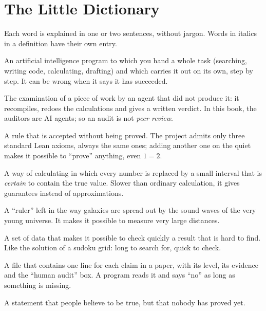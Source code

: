 \chapter{The Little Dictionary}

Each word is explained in one or two sentences, without jargon. Words in italics in a definition have their own entry.

\begin{description}[style=nextline,leftmargin=0pt,font=\normalfont\sffamily\bfseries\color{okbleu},itemsep=5pt]
\item[AI agent] An artificial intelligence program to which you hand a whole task (searching, writing code,
calculating, drafting) and which carries it out on its own, step by step. It can be wrong when it says it has
succeeded.
\item[Audit] The examination of a piece of work by an agent that did not produce it: it recompiles, redoes the
calculations and gives a written verdict. In this book, the auditors are AI agents; so an audit is not \emph{peer
review}.
\item[Axiom] A rule that is accepted without being proved. The project admits only three standard Lean axioms, always the same ones; adding
another one on the quiet makes it possible to ``prove'' anything, even $1=2$.
\item[Ball (or interval) arithmetic] A way of calculating in which every number is replaced by a small interval that is
\emph{certain} to contain the true value. Slower than ordinary calculation, it gives guarantees instead of
approximations.
\item[BAO (baryon acoustic oscillations)] A ``ruler'' left in the way galaxies are spread out by the sound waves of the
very young universe. It makes it possible to measure very large distances.
\item[Certificate] A set of data that makes it possible to check quickly a result that is hard to find. Like the
solution of a sudoku grid: long to search for, quick to check.
\item[Claims ledger] A file that contains one line for each claim in a paper, with its level, its evidence and the
``human audit'' box. A program reads it and says ``no'' as long as something is missing.
\item[Conjecture] A statement that people believe to be true, but that nobody has proved yet.

\end{description}
